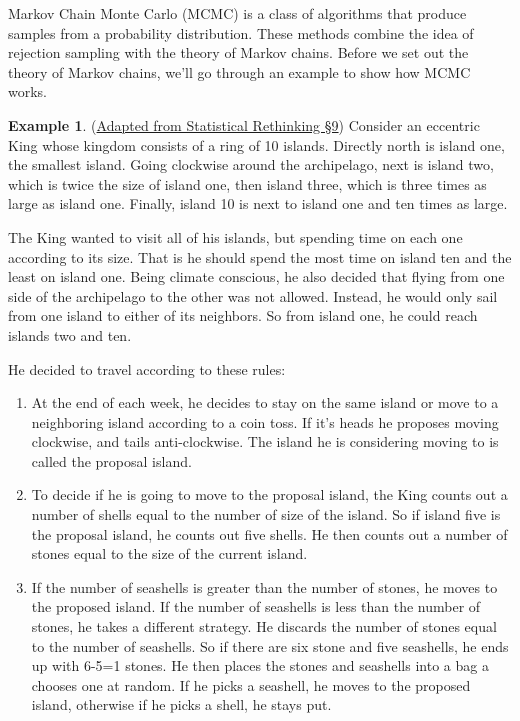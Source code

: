 \documentclass[
]{book}
\theoremstyle{definition}
\theoremstyle{definition}
\newtheorem{example}{Example}[chapter]
\theoremstyle{definition}
\theoremstyle{definition}
\theoremstyle{remark}
\begin{document}
Markov Chain Monte Carlo (MCMC) is a class of algorithms that produce samples from a probability distribution. These methods combine the idea of rejection sampling with the theory of Markov chains. Before we set out the theory of Markov chains, we'll go through an example to show how MCMC works.

\begin{example}
\protect\hypertarget{exm:King}{}\label{exm:King}(\href{https://xcelab.net/rm/statistical-rethinking/}{Adapted from Statistical Rethinking \S 9}) Consider an eccentric King whose kingdom consists of a ring of 10 islands. Directly north is island one, the smallest island. Going clockwise around the archipelago, next is island two, which is twice the size of island one, then island three, which is three times as large as island one. Finally, island 10 is next to island one and ten times as large.

The King wanted to visit all of his islands, but spending time on each one according to its size. That is he should spend the most time on island ten and the least on island one. Being climate conscious, he also decided that flying from one side of the archipelago to the other was not allowed. Instead, he would only sail from one island to either of its neighbors. So from island one, he could reach islands two and ten.

He decided to travel according to these rules:

\begin{enumerate}
\def\labelenumi{\arabic{enumi}.}
\item
  At the end of each week, he decides to stay on the same island or move to a neighboring island according to a coin toss. If it's heads he proposes moving clockwise, and tails anti-clockwise. The island he is considering moving to is called the proposal island.
\item
  To decide if he is going to move to the proposal island, the King counts out a number of shells equal to the number of size of the island. So if island five is the proposal island, he counts out five shells. He then counts out a number of stones equal to the size of the current island.
\item
  If the number of seashells is greater than the number of stones, he moves to the proposed island. If the number of seashells is less than the number of stones, he takes a different strategy. He discards the number of stones equal to the number of seashells. So if there are six stone and five seashells, he ends up with 6-5=1 stones. He then places the stones and seashells into a bag a chooses one at random. If he picks a seashell, he moves to the proposed island, otherwise if he picks a shell, he stays put.
\end{enumerate}


\end{example}
\end{document}
